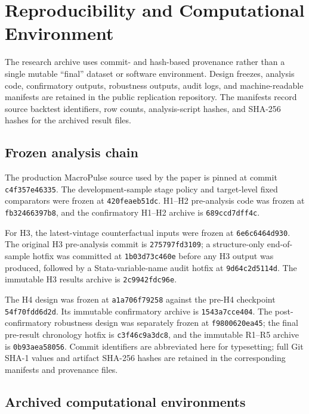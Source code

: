 \section{Reproducibility and Computational Environment}
\label{app:reproducibility}

The research archive uses commit- and hash-based provenance rather than a
single mutable ``final'' dataset or software environment. Design freezes,
analysis code, confirmatory outputs, robustness outputs, audit logs, and
machine-readable manifests are retained in the public replication repository.
The manifests record source backtest identifiers, row counts, analysis-script
hashes, and SHA-256 hashes for the archived result files.

\subsection{Frozen analysis chain}

The production MacroPulse source used by the paper is pinned at commit
\texttt{c4f357\allowbreak e46335}. The development-sample stage policy and
target-level fixed comparators were frozen at
\texttt{420fea\allowbreak eb51dc}. H1--H2 pre-analysis code was frozen at
\texttt{fb3246\allowbreak 6397b8}, and the confirmatory H1--H2 archive is
\texttt{689ccd\allowbreak 7dff4c}.

For H3, the latest-vintage counterfactual inputs were frozen at
\texttt{6e6c64\allowbreak 64d930}. The original H3 pre-analysis commit is
\texttt{275797\allowbreak fd3109}; a structure-only end-of-sample hotfix was
committed at \texttt{1b03d7\allowbreak 3c460e} before any H3 output was
produced, followed by a Stata-variable-name audit hotfix at
\texttt{9d64c2\allowbreak d5114d}. The immutable H3 results archive is
\texttt{2c9942\allowbreak fdc96e}.

The H4 design was frozen at \texttt{a1a706\allowbreak f79258} against the
pre-H4 checkpoint \texttt{54f70f\allowbreak dd6d2d}. Its immutable
confirmatory archive is \texttt{1543a7\allowbreak cce404}. The
post-confirmatory robustness design was separately frozen at
\texttt{f98006\allowbreak 20ea45}; the final pre-result chronology hotfix is
\texttt{c3f46c\allowbreak 9a3dc8}, and the immutable R1--R5 archive is
\texttt{0b93ae\allowbreak a58056}. Commit identifiers are abbreviated here
for typesetting; full Git SHA-1 values and artifact SHA-256 hashes are retained
in the corresponding manifests and provenance files.

\subsection{Archived computational environments}

